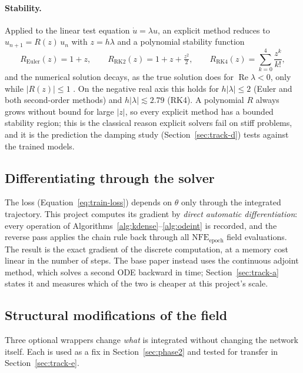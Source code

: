 \paragraph{Stability.} Applied to the linear test equation
$\dot u=\lambda u$, an explicit method reduces to $u_{n+1}=R(z)\,u_n$ with
$z=h\lambda$ and a polynomial stability function
\begin{equation}
R_{\text{Euler}}(z)=1+z,\qquad
R_{\text{RK2}}(z)=1+z+\tfrac{z^2}{2},\qquad
R_{\text{RK4}}(z)=\sum_{k=0}^{4}\frac{z^k}{k!},
\label{eq:stability-function}
\end{equation}
and the numerical solution decays, as the true solution does for
$\operatorname{Re}\lambda<0$, only while $|R(z)|\le1$
\cite{hairer1996solving}. On the negative real axis this holds for
$h|\lambda|\le2$ (Euler and both second-order methods) and
$h|\lambda|\lesssim2.79$ (RK4). A polynomial $R$ always grows without bound
for large $|z|$, so every explicit method has a bounded stability region;
this is the classical reason explicit solvers fail on stiff problems, and it
is the prediction the damping study (Section~\ref{sec:track-d}) tests
against the trained models.

\subsection{Differentiating through the solver}

The loss (Equation~\ref{eq:train-loss}) depends on $\theta$ only through the
integrated trajectory. This project computes its gradient by
\emph{direct automatic differentiation}: every operation of
Algorithms~\ref{alg:kdense}--\ref{alg:odeint} is recorded, and the reverse
pass applies the chain rule back through all $\mathrm{NFE}_{\text{epoch}}$
field evaluations. The result is the exact gradient of the discrete
computation, at a memory cost linear in the number of steps. The base paper
instead uses the continuous adjoint method, which solves a second ODE
backward in time; Section~\ref{sec:track-a} states it and measures which of
the two is cheaper at this project's scale.

\subsection{Structural modifications of the field}

Three optional wrappers change \emph{what} is integrated without changing the
network itself. Each is used as a fix in Section~\ref{sec:phase2} and tested
for transfer in Section~\ref{sec:track-e}.


